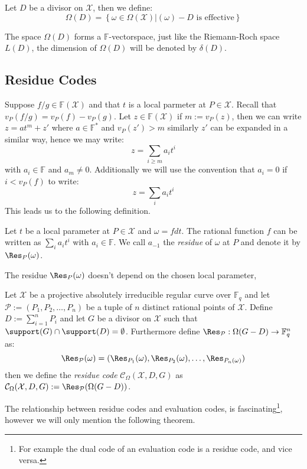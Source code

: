 \begin{definition}
  Let $D$ be a divisor on $\mathcal{X}$, then we define:
  \begin{equation*}
    \Omega(D) = \left\{\omega \in \Omega(\mathcal{X}) | (\omega) - D \text{ is effective} \right\}
  \end{equation*}
\end{definition}
The space $\Omega(D)$ forms a $\mathbb{F}$-vectorspace, just like the Riemann-Roch space $L(D)$, the dimension of $\Omega(D)$ will be denoted by $\delta(D)$.
\subsection{Residue Codes}
Suppose $f / g \in \mathbb{F}(\mathcal{X})$ and that $t$ is a local parmeter at $P \in \mathcal{X}$. Recall that $v_P(f / g) = v_P(f) - v_P(g)$. Let $z \in \mathbb{F}(\mathcal{X})$ if $m := v_P(z)$, then we can write $z = a t^m + z'$ where $a \in \mathbb{F}^{*}$ and $v_P(z') > m$ similarly $z'$ can be expanded in a similar way, hence we may write:
\begin{equation*}
  z = \sum_{i \geq m} a_i t^i
\end{equation*}
with $a_i \in \mathbb{F}$ and $a_m \neq 0$. Additionally we will use the convention that $a_i = 0$ if $i < v_P(f)$ to write:
\begin{equation*}
  z = \sum_i a_i t^i
\end{equation*}
This leads us to the following definition.
\begin{definition}
  Let $t$ be a local parameter at $P \in \mathcal{X}$ and $\omega = f dt$. The rational function $f$ can be written as $\sum_i a_i t^i$ with $a_i \in \mathbb{F}$. We call $a_{-1}$ the \textit{residue} of $\omega$ at $P$ and denote it by $\Res_P(\omega)$.
\end{definition}
The residue $\Res_P(\omega)$ doesn't depend on the chosen local parameter,

\begin{definition}
  Let $\mathcal{X}$ be a projective absolutely irreducible regular curve over $\mathbb{F}_q$ and let $\mathcal{P} := (P_1, P_2, \ldots, P_{n})$ be a tuple of $n$ distinct rational points of $\mathcal{X}$. Define $D := \sum^n_{i = 1} P_i$ and let $G$ be a divisor on $\mathcal{X}$ such that $\support(G) \cap \support(D) = \emptyset$. Furthermore define $\Res_{\mathcal{P}}: \Omega(G - D) \to \mathbb{F}_q^n$ as:
  \begin{equation*}
    \Res_{\mathcal{P}}(\omega) = (\Res_{P_1}(\omega), \Res_{P_2}(\omega), \ldots, \Res_{P_{n}(\omega)})
  \end{equation*}
  then we define the \textit{residue code} $\mathcal{C}_\Omega(\mathcal{X}, D, G)$ as $\mathcal{C}_\Omega(\mathcal{X}, D, G) := \Res_{\mathcal{P}}(\Omega(G - D))$.
\end{definition}
The relationship between residue codes and evaluation codes, is fascinating\footnote{For example the dual code of an evaluation code is a residue code, and vice versa.}, however we will only mention the following theorem.


